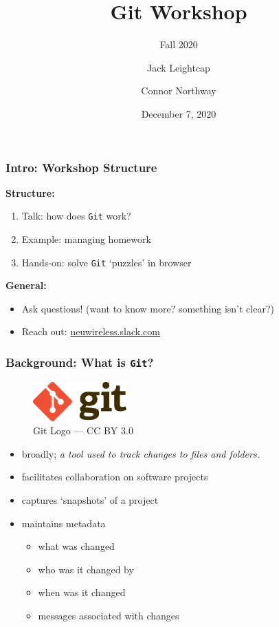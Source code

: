 \documentclass{beamer} \usetheme{Madrid}
\title{Git Workshop}
\subtitle{Fall 2020}
\author[]{Jack Leightcap\inst{1}\inst{2} \and Connor Northway\inst{2}}
\institute[IEEE, Wireless Club]{
    \inst{1}IEEE -- \url{nuieeeofficers@gmail.com}
    \and
    \inst{2}Wireless Club -- \url{nuwirelessclub@gmail.com}
}
\date[Fall 2020]{December 7, 2020}
\begin{document}
\frame{\titlepage}

\begin{frame}
    \frametitle{Intro: Workshop Structure}
    \centering \textbf{Structure:}
    \begin{enumerate}
        \setlength\itemsep{1em}
        \item Talk: how does \texttt{Git} work?
        \item Example: managing homework
        \item Hands-on: solve \texttt{Git} `puzzles' in browser
    \end{enumerate}
    \vfill
    \centering \textbf{General:}
    \begin{itemize}
        \setlength\itemsep{1em}
        \item Ask questions!
              (want to know more? something isn't clear?)
        \item Reach out: \url{neuwireless.slack.com}
    \end{itemize}
\end{frame}

\begin{frame}
    \frametitle{Background: What is \texttt{Git}?}
    \vfill
    \begin{figure}
        \includegraphics[height=15mm]{logo.png}
        \caption{Git Logo --- CC BY 3.0}
    \end{figure}
    \vfill
    \begin{itemize}
        \item broadly; \emph{a tool used to track changes to files and folders.}
        \item facilitates collaboration on software projects
        \item captures `snapshots' of a project
        \item maintains metadata
        \begin{itemize}
            \item what was changed
            \item who was it changed by
            \item when was it changed
            \item messages associated with changes
        \end{itemize}
    \end{itemize}
    \vfill
\end{frame}
\end{document}
